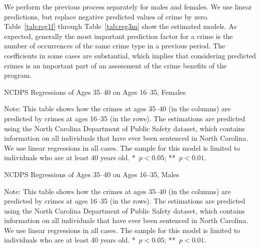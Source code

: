 \noindent We perform the previous process separately for males and females. We use linear predictions, but replace negative predicted values of crime by zero. Table~\ref{tab:reg1f} through Table~\ref{tab:reg3m} show the estimated models. As expected, generally the most important prediction factor for a crime is the number of occurrences of the same crime type in a previous period. The coefficients in some cases are substantial, which implies that considering predicted crimes is an important part of an assessment of the crime benefits of the program. \\
\begin{table}
\caption{NCDPS Regressions of Ages 35--40 on Ages 16--35, Females} \label{tab:reg1f}
\begin{adjustbox}{max width=\textwidth}
\begin{threeparttable}

\begin{tablenotes}
\item Note: This table shows how the crimes at ages 35--40 (in the columns) are predicted by crimes at ages 16--35 (in the rows). The estimations are predicted using the North Carolina Department of Public Safety dataset, which contains information on all individuals that have ever been sentenced in North Carolina. We use linear regressions in all cases. The sample for this model is limited to individuals who are at least 40 years old. *~$p<0.05$; **~$p<0.01$.
\end{tablenotes}
\end{threeparttable}
\end{adjustbox}
\end{table}


\begin{table}
\caption{NCDPS Regressions of Ages 35--40 on Ages 16--35, Males} \label{tab:reg1m}
\begin{adjustbox}{max width=\textwidth}
\begin{threeparttable}

\begin{tablenotes}
\item Note: This table shows how the crimes at ages 35--40 (in the columns) are predicted by crimes at ages 16--35 (in the rows). The estimations are predicted using the North Carolina Department of Public Safety dataset, which contains information on all individuals that have ever been sentenced in North Carolina. We use linear regressions in all cases. The sample for this model is limited to individuals who are at least 40 years old. *~$p<0.05$; **~$p<0.01$.
\end{tablenotes}
\end{threeparttable}
\end{adjustbox}
\end{table}


